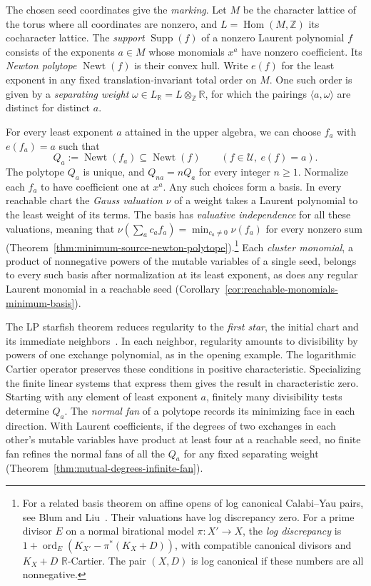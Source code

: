 \documentclass[11pt,reqno]{amsart}
\numberwithin{equation}{section}
\theoremstyle{definition}
\theoremstyle{remark}
\DeclareMathOperator{\Newt}{Newt}
\DeclareMathOperator{\Supp}{Supp}
\begin{document}
The chosen seed coordinates give the \emph{marking}. Let \(M\) be the character lattice of the torus where
all coordinates are nonzero, and \(L=\operatorname{Hom}(M,\mathbb Z)\)
its cocharacter lattice. The \emph{support} \(\Supp(f)\) of a nonzero
Laurent polynomial \(f\) consists of the exponents \(a\in M\) whose
monomials \(x^a\) have nonzero coefficient. Its \emph{Newton polytope}
\(\Newt(f)\) is their convex hull. Write \(e(f)\) for the least
exponent in any fixed translation-invariant total order on \(M\).
One such order is given by a \emph{separating weight}
\(\omega\in L_{\mathbb R}=L\otimes_{\mathbb Z}\mathbb R\), for which
the pairings \(\langle a,\omega\rangle\) are distinct for distinct \(a\).

For every least exponent \(a\) attained in the upper algebra, we can
choose \(f_a\) with \(e(f_a)=a\) such that
\[ Q_a:=\Newt(f_a)\subseteq\Newt(f)\qquad(f\in\mathcal U,\ e(f)=a). \]
The polytope \(Q_a\) is unique, and \(Q_{na}=nQ_a\) for every integer \(n\ge1\).
Normalize each \(f_a\) to have coefficient one at \(x^a\). Any such
choices form a basis. In every reachable chart the \emph{Gauss valuation}
\(\nu\) of a weight takes a Laurent polynomial to the least weight of
its terms. The basis has \emph{valuative independence} for all these
valuations, meaning that \(\nu(\sum_a c_af_a)=\min_{c_a\ne0}\nu(f_a)\)
for every nonzero sum (Theorem~\ref{thm:minimum-source-newton-polytope}).\footnote{For a related basis theorem on affine opens of log canonical
Calabi--Yau pairs, see Blum and Liu~\cite[Theorem~1.2]{BL}. Their
valuations have log discrepancy zero. For a prime divisor \(E\) on a
normal birational model \(\pi:X'\to X\), the \emph{log discrepancy} is
\(1+\operatorname{ord}_E(K_{X'}-\pi^*(K_X+D))\), with compatible
canonical divisors and \(K_X+D\) \(\mathbb R\)-Cartier. The pair
\((X,D)\) is log canonical if these numbers are all nonnegative.}
Each \emph{cluster monomial}, a product of nonnegative powers of the
mutable variables of a single seed, belongs to every such basis after
normalization at its least exponent, as does any regular Laurent monomial
in a reachable seed (Corollary~\ref{cor:reachable-monomials-minimum-basis}).

The LP starfish theorem reduces regularity to the \emph{first star},
the initial chart and its immediate neighbors~\cite[Theorem~1.3]{Branching}.
In each neighbor, regularity amounts to divisibility by powers of
one exchange polynomial, as in the opening example. The logarithmic
Cartier operator preserves these conditions in positive characteristic.
Specializing the finite linear systems that express them gives the
result in characteristic zero. Starting with any element of least
exponent \(a\), finitely many divisibility tests determine \(Q_a\).
The \emph{normal fan} of a polytope records its minimizing face in each
direction. With Laurent coefficients, if the degrees of two exchanges in
each other's mutable variables have product at least four at a reachable
seed, no finite fan refines the normal fans of all the \(Q_a\) for any
fixed separating weight
(Theorem~\ref{thm:mutual-degrees-infinite-fan}).
\end{document}
